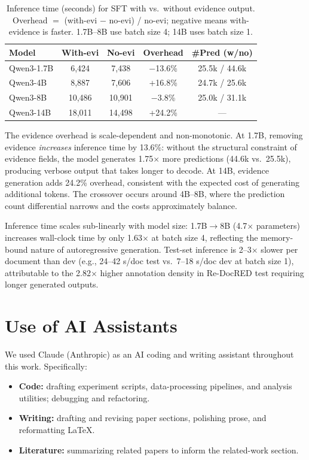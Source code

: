 \begin{table}[t]
\centering
\caption{Inference time (seconds) for SFT with vs.\ without evidence output. Overhead $=$ (with-evi $-$ no-evi) / no-evi; negative means with-evidence is faster. 1.7B--8B use batch size 4; 14B uses batch size 1.}
\label{tab:inference_efficiency}
\small
\begin{tabular}{lcccc}
\toprule
\textbf{Model} & \textbf{With-evi} & \textbf{No-evi} & \textbf{Overhead} & \textbf{\#Pred (w/no)} \\
\midrule
Qwen3-1.7B & 6,424 & 7,438 & $-$13.6\% & 25.5k / 44.6k \\
Qwen3-4B & 8,887 & 7,606 & +16.8\% & 24.7k / 25.6k \\
Qwen3-8B & 10,486 & 10,901 & $-$3.8\% & 25.0k / 31.1k \\
\midrule
Qwen3-14B & 18,011 & 14,498 & +24.2\% & --- \\
\bottomrule
\end{tabular}
\end{table}

The evidence overhead is scale-dependent and non-monotonic. At 1.7B, removing evidence \emph{increases} inference time by 13.6\%: without the structural constraint of evidence fields, the model generates 1.75$\times$ more predictions (44.6k vs.\ 25.5k), producing verbose output that takes longer to decode. At 14B, evidence generation adds 24.2\% overhead, consistent with the expected cost of generating additional tokens. The crossover occurs around 4B--8B, where the prediction count differential narrows and the costs approximately balance.

Inference time scales sub-linearly with model size: 1.7B$\to$8B (4.7$\times$ parameters) increases wall-clock time by only 1.63$\times$ at batch size 4, reflecting the memory-bound nature of autoregressive generation. Test-set inference is 2--3$\times$ slower per document than dev (e.g., 24--42 s/doc test vs.\ 7--18 s/doc dev at batch size 1), attributable to the 2.82$\times$ higher annotation density in Re-DocRED test requiring longer generated outputs.


\section{Use of AI Assistants}
\label{app:ai-assistants}

We used Claude (Anthropic) as an AI coding and writing assistant
throughout this work. Specifically:
\begin{itemize}
    \item \textbf{Code:} drafting experiment scripts, data-processing
    pipelines, and analysis utilities; debugging and refactoring.
    \item \textbf{Writing:} drafting and revising paper sections,
    polishing prose, and reformatting LaTeX.
    \item \textbf{Literature:} summarizing related papers to inform
    the related-work section.
\end{itemize}
